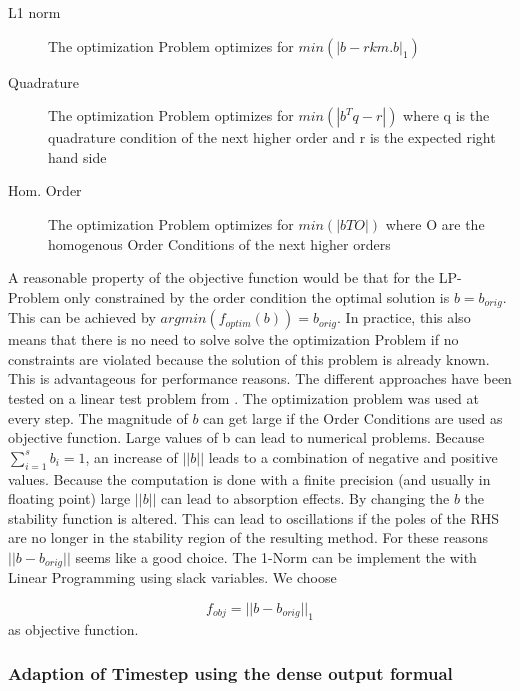 \documentclass[a4paper]{scrartcl}
\numberwithin{equation}{section}
\theoremstyle{plain}
\theoremstyle{definition}
\numberwithin{theorem}{section}
\newcommand{\1}{\mathbbm{1}}
\begin{document}
\begin{description}

\item[L1 norm] The optimization Problem optimizes for $min(|b-rkm.b|_1)$
            
\item[Quadrature]   The optimization Problem optimizes for $min(|b^Tq-r|)$
                            where q is the quadrature condition of the next higher order 
                            and r is the expected right hand side
            
\item[Hom. Order]    The optimization Problem optimizes for $min(|bTO|)$ where O are the homogenous Order Conditions of the next higher orders
                            
 
\end{description}

A reasonable property of the objective function would be that for the LP-Problem only constrained by the order condition the optimal solution is $b = b_{orig}$. 
This can be achieved by $argmin(f_{optim}(b)) = b_{orig}$. 
In practice, this also means that there is no need to solve solve the optimization Problem if no constraints are violated because the solution of this problem is already known. This is advantageous for performance reasons.
The different approaches have been tested on a linear test problem from \cite{kopecz_unconditionally_2018}. The optimization problem was used at every step.
The magnitude of $b$ can get large if the Order Conditions are used as objective function.
Large values of b can lead to numerical problems. Because $\sum_{i  = 1}^s b_i = 1$, an increase of $||b||$ leads to a combination of negative and positive values. Because the computation is done with a finite precision (and usually in floating point) large $||b||$ can lead to absorption effects.    
By changing the $b$ the stability function is altered. This can lead to oscillations if the poles of the RHS are no longer in the stability region of the resulting method.
For these reasons $||b-b_{orig}||$ seems like a good choice. The 1-Norm can be implement the with Linear Programming using slack variables. We choose 

\begin{equation}
f_{obj} = ||b-b_{orig}||_1
\end{equation}
 as objective function.



\subsubsection{Adaption of Timestep using the dense output formual}
\end{document}
